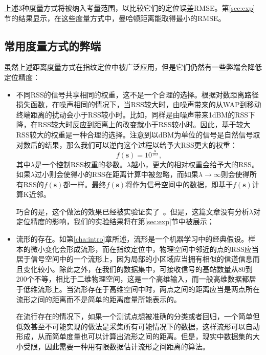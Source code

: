 上述3种度量方式将被纳入考量范围，以比较它们的定位误差RMSE。第\ref{sec:exp}节的结果显示，在这些度量方式中，曼哈顿距离能取得最小的RMSE。

\subsection{常用度量方式的弊端}

虽然上述距离度量方式在指纹定位中被广泛应用，但是它们仍然有一些弊端会降低定位精度：
\begin{itemize}
	\item 不同RSS的信号共享相同的权重，这不是一个合理的选择。根据对数距离路径损失函数，在噪声相同的情况下，当RSS较大时，由噪声带来的从WAP到移动终端距离的扰动会小于RSS较小时。比如，同样是由噪声带来1dBM的RSS下降，在RSS较大时反应到距离上的改变就小于RSS较小时。因此，基于较大RSS较大的权重是一种合理的选择。注意到以dBM为单位的信号是自然信号取对数后的结果，那么我们可以逆向这个过程以给予大RSS更大的权重：
	\begin{equation}
	f(\mathbf{s}) = \mathrm{10}^{\frac{\mathbf{s}}{10\lambda}}, \label{eq:exp}
	\end{equation}
	其中$\lambda$是一个控制RSS权重的参数。$\lambda$越小，更大的相对权重会给予大的RSS。如果$\lambda$过小则会使得小的RSS在距离计算中被忽略，而如果$\lambda \rightarrow \infty$则会使得所有RSS的$f(\mathbf{s})$都一样。最终$f(\mathbf{s})$将作为信号空间中的数据，即基于$f(\mathbf{s})$计算K近邻。
	
	巧合的是，这个做法的效果已经被实验证实了~\cite{torres2015comprehensive}。但是，这篇文章没有分析$\lambda$对定位精度的影响，我们的实验结果将在第\ref{sec:exp}节中被展示；
	
	\item 流形的存在。如第\ref{cha:intro}章所述，流形是一个机器学习中的经典假设。样本的微小变化会形成流形，而在指纹定位中，物理空间中邻近的点的RSS应当居于信号空间中的一个流形上，因为局部的小区域应当拥有相似的信道信息而且变化较小。除此之外，在我们的数据集中，可接收信号的基站数量从80到200个不等，相比于二维物理空间，这是一个高维输入，而一般高维数据都居于低维流形上。当流形存在于高维空间中时，两点之间的距离应当是两点所在流形之间的距离而不是简单的距离度量所能表示的。
	
	在流行存在的情况下，如果一个测试点想被准确的分类或者回归，一个简单但低效甚至不可能实现的做法是采集所有可能情况下的数据，这样流形可以自动形成，从而简单度量也可以计算出流形之间的距离。但是，现实中数据集的大小受限，因此需要一种用有限数据估计流形之间距离的算法。
\end{itemize}

